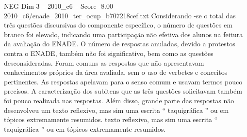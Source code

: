 \begin{textsample}{NEG Dim 3 – 2010\_c6 – Score -8.00 – 2010\_c6/enade\_2010\_ter\_ocup\_b707218cef.txt}
Considerando -se o total das três questões discursivas do componente específico, o número de questões em branco foi elevado, indicando uma participação não efetiva dos alunos na feitura da avaliação do ENADE.
O número de respostas anuladas, devido a protestos contra o ENADE, também não foi significativo, bem como as questões desconsideradas.
Foram comuns as respostas que não apresentavam conhecimentos próprios da área avaliada, sem o uso de verbetes e conceitos pertinentes.
As respostas apelavam para o senso comum e usavam termos pouco precisos.
A caracterização dos subitens que as três questões solicitavam também foi pouco realizada nas respostas.
Além disso, grande parte das respostas não desenvolveu um texto reflexivo, mas sim uma escrita “ taquigráfica ” ou em tópicos extremamente resumidos. texto reflexivo, mas sim uma escrita “ taquigráfica ” ou em tópicos extremamente resumidos.

\end{textsample}
